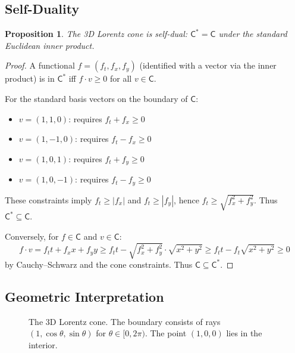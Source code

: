 \documentclass[11pt,a4paper]{article}
\newtheorem{proposition}[theorem]{Proposition}
\theoremstyle{definition}
\newcommand{\C}{\mathsf{C}}
\newcommand{\Cstar}{\mathsf{C}^*}
\begin{document}
\subsection{Self-Duality}

\begin{proposition}\label{prop:lorentz-selfdual}
The 3D Lorentz cone is self-dual: $\Cstar = \C$ under the standard Euclidean inner product.
\end{proposition}

\begin{proof}
A functional $f = (f_t, f_x, f_y)$ (identified with a vector via the inner product) is in $\Cstar$ iff $f \cdot v \geq 0$ for all $v \in \C$.

For the standard basis vectors on the boundary of $\C$:
\begin{itemize}
    \item $v = (1, 1, 0)$: requires $f_t + f_x \geq 0$
    \item $v = (1, -1, 0)$: requires $f_t - f_x \geq 0$
    \item $v = (1, 0, 1)$: requires $f_t + f_y \geq 0$
    \item $v = (1, 0, -1)$: requires $f_t - f_y \geq 0$
\end{itemize}

These constraints imply $f_t \geq |f_x|$ and $f_t \geq |f_y|$, hence $f_t \geq \sqrt{f_x^2 + f_y^2}$. Thus $\Cstar \subseteq \C$.

Conversely, for $f \in \C$ and $v \in \C$:
\[
f \cdot v = f_t t + f_x x + f_y y \geq f_t t - \sqrt{f_x^2 + f_y^2} \cdot \sqrt{x^2 + y^2} \geq f_t t - f_t \sqrt{x^2+y^2} \geq 0
\]
by Cauchy--Schwarz and the cone constraints. Thus $\C \subseteq \Cstar$.
\end{proof}

\subsection{Geometric Interpretation}

\begin{figure}[h]
\centering
{}
\caption{The 3D Lorentz cone. The boundary consists of rays $(1, \cos\theta, \sin\theta)$ for $\theta \in [0, 2\pi)$. The point $(1,0,0)$ lies in the interior.}
\end{figure}
\end{document}
